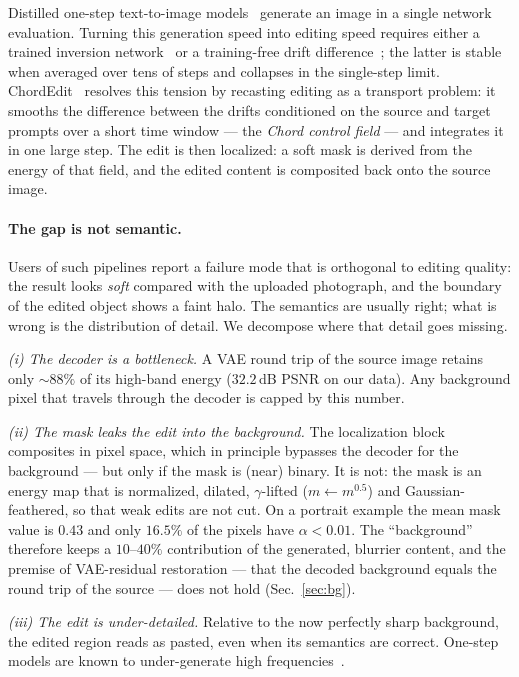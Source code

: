 \documentclass[10pt,twocolumn,letterpaper]{article}
\begin{document}
Distilled one-step text-to-image models~\cite{sdxl_lightning,sd_turbo,swiftbrush2,instaflow}
generate an image in a single network evaluation. Turning this generation speed
into editing speed requires either a trained inversion
network~\cite{swiftedit} or a training-free drift difference~\cite{flowedit,infedit};
the latter is stable when averaged over tens of steps and collapses in the
single-step limit. ChordEdit~\cite{chordedit} resolves this tension by recasting
editing as a transport problem: it smooths the difference between the drifts
conditioned on the source and target prompts over a short time window --- the
\emph{Chord control field} --- and integrates it in one large step. The edit is
then localized: a soft mask is derived from the energy of that field, and the
edited content is composited back onto the source image.

\paragraph{The gap is not semantic.}
Users of such pipelines report a failure mode that is orthogonal to editing
quality: the result looks \emph{soft} compared with the uploaded photograph, and
the boundary of the edited object shows a faint halo. The semantics are usually
right; what is wrong is the distribution of detail. We decompose where that
detail goes missing.

\emph{(i) The decoder is a bottleneck.} A VAE round trip of the source image
retains only $\sim 88\%$ of its high-band energy ($32.2$\,dB PSNR on our data).
Any background pixel that travels through the decoder is capped by this number.

\emph{(ii) The mask leaks the edit into the background.} The localization block
composites in pixel space, which in principle bypasses the decoder for the
background --- but only if the mask is (near) binary. It is not: the mask is an
energy map that is normalized, dilated, $\gamma$-lifted
($m\leftarrow m^{0.5}$) and Gaussian-feathered, so that weak edits are not cut.
On a portrait example the mean mask value is $0.43$ and only $16.5\%$ of the
pixels have $\alpha<0.01$. The ``background'' therefore keeps a $10$--$40\%$
contribution of the generated, blurrier content, and the premise of
VAE-residual restoration --- that the decoded background equals the round trip of
the source --- does not hold (Sec.~\ref{sec:bg}).

\emph{(iii) The edit is under-detailed.} Relative to the now perfectly sharp
background, the edited region reads as pasted, even when its semantics are
correct. One-step models are known to under-generate
high frequencies~\cite{hipa}.
\end{document}

